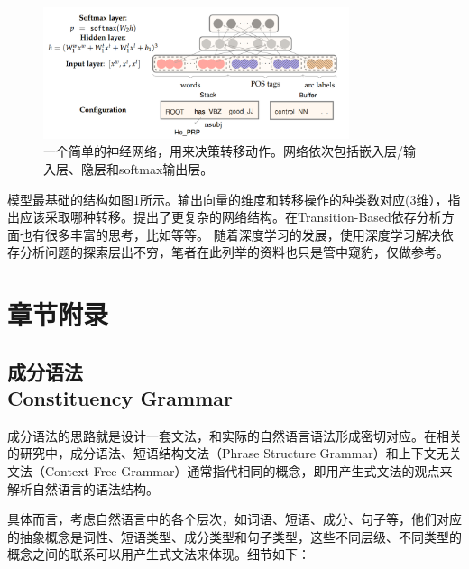 \begin{figure}[!htbp]
\centering
\includegraphics[width = 0.8\textwidth]{chap-04/04-model.png}
\caption{一个简单的神经网络，用来决策转移动作。网络依次包括嵌入层/输入层、隐层和softmax输出层。}
\label{04-net}
\end{figure}

模型最基础的结构如图\ref{04-net}所示。输出向量的维度和转移操作的种类数对应(3维），指出应该采取哪种转移。\cite{04-manning}提出了更复杂的网络结构。在Transition-Based依存分析方面也有很多丰富的思考，比如\cite{04-cnblogs1}等等。
随着深度学习的发展，使用深度学习解决依存分析问题的探索层出不穷，笔者在此列举的资料也只是管中窥豹，仅做参考。


\section{章节附录}

\subsection{成分语法 \\ Constituency Grammar}
\label{Constituency Grammar}

成分语法的思路就是设计一套文法，和实际的自然语言语法形成密切对应。在相关的研究中，成分语法、短语结构文法（Phrase Structure Grammar）和上下文无关文法（Context Free Grammar）通常指代相同的概念，即用产生式文法的观点来解析自然语言的语法结构。

具体而言，考虑自然语言中的各个层次，如词语、短语、成分、句子等，他们对应的抽象概念是词性、短语类型、成分类型和句子类型，这些不同层级、不同类型的概念之间的联系可以用产生式文法来体现。细节如下：

